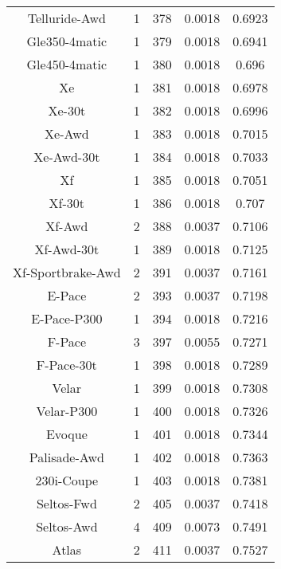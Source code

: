\begin{center}
\begin{tabular}{|c|c|c|c|@{}c@{}|}
Telluride-Awd & 1 & 378 & 0.0018 & 0.6923 \\ 
Gle350-4matic & 1 & 379 & 0.0018 & 0.6941 \\ 
Gle450-4matic & 1 & 380 & 0.0018 & 0.696 \\ 
Xe & 1 & 381 & 0.0018 & 0.6978 \\ 
Xe-30t & 1 & 382 & 0.0018 & 0.6996 \\ 
Xe-Awd & 1 & 383 & 0.0018 & 0.7015 \\ 
Xe-Awd-30t & 1 & 384 & 0.0018 & 0.7033 \\ 
Xf & 1 & 385 & 0.0018 & 0.7051 \\ 
Xf-30t & 1 & 386 & 0.0018 & 0.707 \\ 
Xf-Awd & 2 & 388 & 0.0037 & 0.7106 \\ 
Xf-Awd-30t & 1 & 389 & 0.0018 & 0.7125 \\ 
Xf-Sportbrake-Awd & 2 & 391 & 0.0037 & 0.7161 \\ 
E-Pace & 2 & 393 & 0.0037 & 0.7198 \\ 
E-Pace-P300 & 1 & 394 & 0.0018 & 0.7216 \\ 
F-Pace & 3 & 397 & 0.0055 & 0.7271 \\ 
F-Pace-30t & 1 & 398 & 0.0018 & 0.7289 \\ 
Velar & 1 & 399 & 0.0018 & 0.7308 \\ 
Velar-P300 & 1 & 400 & 0.0018 & 0.7326 \\ 
Evoque & 1 & 401 & 0.0018 & 0.7344 \\ 
Palisade-Awd & 1 & 402 & 0.0018 & 0.7363 \\ 
230i-Coupe & 1 & 403 & 0.0018 & 0.7381 \\ 
Seltos-Fwd & 2 & 405 & 0.0037 & 0.7418 \\ 
Seltos-Awd & 4 & 409 & 0.0073 & 0.7491 \\ 
Atlas & 2 & 411 & 0.0037 & 0.7527 \\ 
\hline
\end{tabular}
\end{center} \vfill

